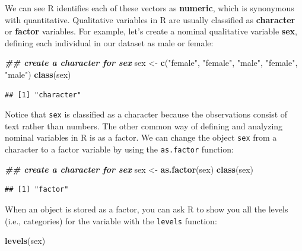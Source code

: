 \documentclass[
]{book}
\newenvironment{Shaded}{\begin{snugshade}}{\end{snugshade}}
\newcommand{\DocumentationTok}[1]{\textcolor[rgb]{0.56,0.35,0.01}{\textbf{\textit{#1}}}}
\newcommand{\FunctionTok}[1]{\textcolor[rgb]{0.13,0.29,0.53}{\textbf{#1}}}
\newcommand{\NormalTok}[1]{#1}
\newcommand{\OtherTok}[1]{\textcolor[rgb]{0.56,0.35,0.01}{#1}}
\newcommand{\StringTok}[1]{\textcolor[rgb]{0.31,0.60,0.02}{#1}}
\begin{document}
We can see R identifies each of these vectors as \textbf{numeric}, which is synonymous with quantitative. Qualitative variables in R are usually classified as \textbf{character} or \textbf{factor} variables. For example, let's create a nominal qualitative variable \textbf{sex}, defining each individual in our dataset as male or female:

\begin{Shaded}
\begin{Highlighting}[]
\DocumentationTok{\#\# create a character for sex}
\NormalTok{sex }\OtherTok{\textless{}{-}} \FunctionTok{c}\NormalTok{(}\StringTok{"female"}\NormalTok{, }\StringTok{"female"}\NormalTok{, }\StringTok{"male"}\NormalTok{, }\StringTok{"female"}\NormalTok{, }\StringTok{"male"}\NormalTok{)}
\FunctionTok{class}\NormalTok{(sex)}
\end{Highlighting}
\end{Shaded}

\begin{verbatim}
## [1] "character"
\end{verbatim}

Notice that \texttt{sex} is classified as a character because the observations consist of text rather than numbers. The other common way of defining and analyzing nominal variables in R is as a factor. We can change the object \texttt{sex} from a character to a factor variable by using the \texttt{as.factor} function:

\begin{Shaded}
\begin{Highlighting}[]
\DocumentationTok{\#\# create a character for sex}
\NormalTok{sex }\OtherTok{\textless{}{-}} \FunctionTok{as.factor}\NormalTok{(sex)}
\FunctionTok{class}\NormalTok{(sex)}
\end{Highlighting}
\end{Shaded}

\begin{verbatim}
## [1] "factor"
\end{verbatim}

When an object is stored as a factor, you can ask R to show you all the levels (i.e., categories) for the variable with the \texttt{levels} function:

\begin{Shaded}
\begin{Highlighting}[]
\FunctionTok{levels}\NormalTok{(sex)}
\end{Highlighting}
\end{Shaded}
\end{document}
